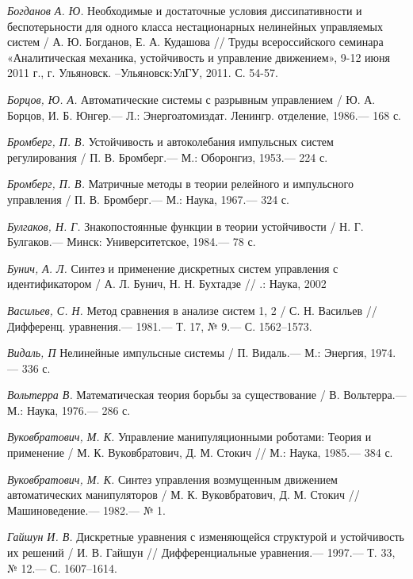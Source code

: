 \begin{thebibliography}{10}
	{\it Богданов А. Ю.} Необходимые и достаточные условия диссипативности и беспотерьности для одного класса нестационарных нелинейных управляемых систем / А. Ю. Богданов, Е. А. Кудашова //
	Труды всероссийского семинара «Аналитическая механика, устойчивость и управление движением», 9-12 июня 2011 г., г. Ульяновск. –Ульяновск:УлГУ, 2011. С. 54-57.
	
	
	{\it Борцов, Ю. А.} Автоматические системы с разрывным управлением / Ю. А. Борцов,
	И. Б. Юнгер.— Л.: Энергоатомиздат. Ленингр. отделение, 1986.— 168 с.
	
	{\it Бромберг, П. В.} Устойчивость и автоколебания импульсных систем регулирования /
	П. В. Бромберг.— М.: Оборонгиз, 1953.— 224 с.
	
	{\it Бромберг, П. В.} Матричные методы в теории релейного и импульсного управления /
	П. В. Бромберг.— М.: Наука, 1967.— 324 с.
	
	{\it Булгаков, Н. Г.} Знакопостоянные функции в теории устойчивости /
	Н. Г. Булгаков.— Минск: Университетское, 1984.— 78 с.
	
	{\it Бунич, А. Л.} Синтез и применение дискретных систем управления с идентификатором /
	А. Л. Бунич, Н. Н. Бухтадзе // .: Наука, 2002
	
	
	{\it Васильев, С. Н.} Метод сравнения в анализе систем 1, 2 / С. Н. Васильев // Дифференц.
	уравнения.— 1981.— Т. 17, № 9.— С. 1562–1573.
	
	{\it Видаль, П} Нелинейные импульсные системы / П. Видаль.— М.: Энергия, 1974.— 336 с.
	
	{\it Вольтерра В.} Математическая теория борьбы за существование /
	В. Вольтерра.— М.: Наука, 1976.— 286 с.
	
	{\it Вуковбратович, М. К.} Управление манипуляционными роботами: Теория и применение /
	М. К. Вуковбратович, Д. М. Стокич // М.: Наука, 1985.— 384 с.
	
	{\it Вуковбратович, М. К.} Синтез управления возмущенным движением автоматических манипуляторов /
	М. К. Вуковбратович, Д. М. Стокич // Машиноведение.— 1982.— № 1.
	
	{\it Гайшун И. В.} Дискретные уравнения с изменяющейся структурой и устойчивость их решений /
	И. В. Гайшун // Дифференциальные уравнения.— 1997.— Т. 33, № 12.— С. 1607–1614.
	

\end{thebibliography}
